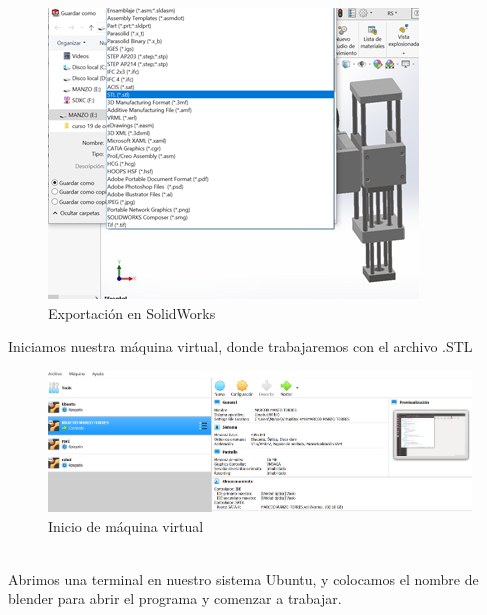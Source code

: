 \documentclass[11pt,a4paper,oldfontcommands,oneside]{memoir}
\begin{document}
\begin{figure}[h]
\includegraphics[scale=.9]{1.png}
\caption{Exportación en SolidWorks}
\label{Imagen 1}
\end{figure}
Iniciamos nuestra máquina virtual, donde trabajaremos con el archivo .STL
\begin{figure}[h]
\includegraphics[scale=.7]{maquina.png}
\caption{Inicio de máquina virtual}
\label{Imagen 2}
\end{figure}\\
Abrimos una terminal en nuestro sistema Ubuntu, y colocamos el nombre de blender para abrir el programa y comenzar a trabajar.
\end{document}

